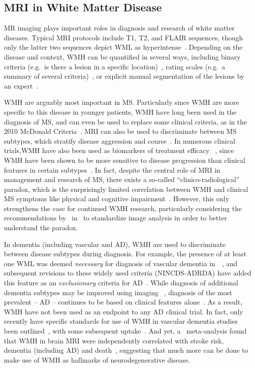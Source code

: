 \subsection{MRI in White Matter Disease}
MR imaging plays important roles in diagnosis and research of white matter diseases.
Typical MRI protocols include T1, T2, and FLAIR sequences,
though only the latter two sequences depict WML as hyperintense~\cite{Simon2006,Wardlaw2013}.
Depending on the disease and context, WMH can be quantified in several ways,
including binary criteria (e.g.\ is there a lesion in a specific location)~\cite{Polman2011},
rating scales (e.g.\ a summary of several criteria)~\cite{Fazekas1987},
or explicit manual segmentation of the lesions by an expert~\cite{Egger2017}.
\par
WMH are arguably most important in MS.
Particularly since WMH are more specific to this disease in younger patients,
WMH have long been used in the diagnosis of MS,
and can even be used to replace some clinical criteria,
as in the 2010 McDonald Criteria~\cite{Polman2011}.
MRI can also be used to discriminate between MS subtypes,
which stratify disease aggression and course~\cite{Polman2011,Lublin2014,Traboulsee2015}.
In numerous clinical trials,WMH have also been used as biomarkers of treatment efficacy
~\cite{Sormani2013,Fahrbach2013,Ziemssen2015},
since WMH have been shown to be more sensitive to disease progression than clinical features
in certain subtypes~\cite{ORiordan1998}.
In fact, despite the central role of MRI in management and research of MS,
there exists a so-called ``clinico-radiological'' paradox,
which is the surprisingly limited correlation between WMH and clinical MS symptoms
like physical and cognitive impairment~\cite{Mollison2017}.
However, this only strengthens the case for continued WMH research,
particularly considering the recommendations by~\citeauthor{Mollison2017} in~\cite{Mollison2017}
to standardize image analysis in order to better understand the paradox.
\par
In dementia (including vascular and AD),
WMH are used to discriminate between disease subtypes during diagnosis.
For example, the presence of at least one WML was deemed \textit{necessary}
for diagnosis of vascular dementia in~\citeyear{Roman1993}~\cite{Roman1993},
and subsequent revisions to these widely used criteria (NINCDS-ADRDA)
have added this feature as an \textit{exclusionary} criteria for AD~\cite{Dubois2007}.
While diagnosis of additional dementia subtypes may be improved using imaging
~\cite{Sorbi2012,Verhagen2016}, diagnosis of the most prevalent -- AD --
continues to be based on clinical features alone~\cite{McKhann2011}.
As a result, WMH have not been used as an endpoint to any AD clinical trial.
In fact, only recently have specific standards for
use of WMH in vascular dementia studies been outlined~\cite{Wardlaw2013,Wardlaw2015},
with some subsequent uptake~\cite{VanWesten2016}.
And yet, a~\citeyear{Debette2010} meta-analysis found that
WMH in brain MRI were independently correlated with
stroke risk, dementia (including AD) and death~\cite{Debette2010},
suggesting that much more can be done to make use of WMH as hallmarks of neurodegenerative disease.
